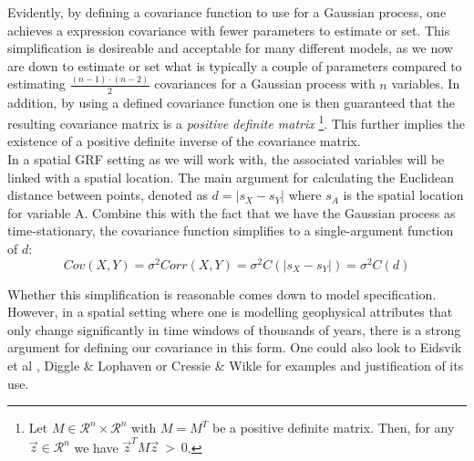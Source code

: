 Evidently, by defining a covariance function to use for a Gaussian process, one achieves a expression covariance with fewer parameters to estimate or set. This simplification is desireable and acceptable for many different models, as we now are down to estimate or set what is typically a couple of parameters compared to estimating $\frac{(n-1)\cdot(n - 2)}{2}$ covariances for a Gaussian process with $n$ variables. In addition, by using a defined covariance function one is then guaranteed that the resulting covariance matrix is a \textit{positive definite matrix} \footnote{Let $M \in \mathcal{R}^n \times \mathcal{R}^n$ with $M = M^T$ be a positive definite matrix. Then, for any $\vec{z} \in \mathcal{R}^n$ we have $\vec{z}^T M \vec{z} \ > \ 0$.}. This further implies the existence of a positive definite inverse of the covariance matrix. \\

In a spatial GRF setting as we will work with, the associated variables will be linked with a spatial location. The main argument for calculating the Euclidean distance between points, denoted as $d = |s_X - s_Y|$ where $s_A$ is the spatial location for variable A. Combine this with the fact that we have the Gaussian process as time-stationary, the covariance function simplifies to a single-argument function of $d$:
\begin{equation}
Cov(X, Y) = \sigma^2Corr(X, Y) = \sigma^2C(|s_X - s_Y|) = \sigma^2C(d)
\end{equation}

Whether this simplification is reasonable comes down to model specification. However, in a spatial setting where one is modelling geophysical attributes that only change significantly in time windows of thousands of years, there is a strong argument for defining our covariance in this form. One could also look to Eidsvik et al \cite{EidsvikEtAl}, Diggle \& Lophaven \cite{DiggleEtAl} or Cressie \& Wikle \cite{CressieEtAl} for examples and justification of its use.

